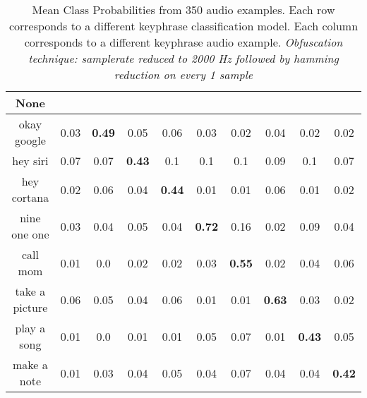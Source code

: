 \begin{table}[!th]
\begin{tabular}{cccccccccc}%
\hline%
None&\rotate{random talk}{70}&\rotate{okay google}{70}&\rotate{hey siri}{70}&\rotate{hey cortana}{70}&\rotate{nine one one}{70}&\rotate{call mom}{70}&\rotate{take a picture}{70}&\rotate{play a song}{70}&\rotate{make a note}{70}\\%
\hline%
okay google&0.03&\textbf{0.49}&0.05&0.06&0.03&0.02&0.04&0.02&0.02\\%
hey siri&0.07&0.07&\textbf{0.43}&0.1&0.1&0.1&0.09&0.1&0.07\\%
hey cortana&0.02&0.06&0.04&\textbf{0.44}&0.01&0.01&0.06&0.01&0.02\\%
nine one one&0.03&0.04&0.05&0.04&\textbf{0.72}&0.16&0.02&0.09&0.04\\%
call mom&0.01&0.0&0.02&0.02&0.03&\textbf{0.55}&0.02&0.04&0.06\\%
take a picture&0.06&0.05&0.04&0.06&0.01&0.01&\textbf{0.63}&0.03&0.02\\%
play a song&0.01&0.0&0.01&0.01&0.05&0.07&0.01&\textbf{0.43}&0.05\\%
make a note&0.01&0.03&0.04&0.05&0.04&0.07&0.04&0.04&\textbf{0.42}\\%
\hline%
\end{tabular}
\caption{Mean Class Probabilities from 350 audio examples. Each row corresponds to a different keyphrase classification model. Each column corresponds to a different keyphrase audio example. \emph{Obfuscation technique: samplerate reduced to 2000 Hz followed by hamming reduction on every 1 sample}}
\label{tab:probs_samplerate_2000_hamming_1}
\end{table}








